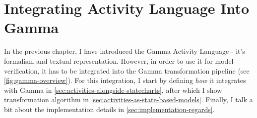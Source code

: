 \chapter{Integrating Activity Language Into Gamma}\label{ch:activiy_verification}

In the previous chapter, I have introduced the Gamma Activity Language - it's formalism and textual representation. However, in order to use it for model verification, it has to be integrated into the Gamma transformation pipeline (see \autoref{fig:gamma-overview}). For this integration, I start by defining \emph{how} it integrates with Gamma in \autoref{sec:activities-alongside-statecharts}, after which I show transformation algorithm in \autoref{sec:activities-as-state-based-models}. Finally, I talk a bit about the implementation details in \autoref{sec:implementation-regards}. 




